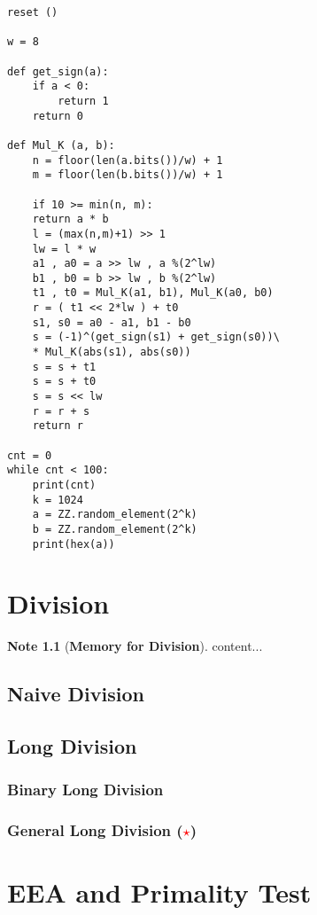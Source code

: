 \documentclass[12pt,openany]{book}
\theoremstyle{definition}
\newtheorem*{note}{Note}
\begin{document}
\newpage
\begin{lstlisting}[style=sage, caption={Karatsuba SAGE ver.},captionpos=t]
reset ()

w = 8

def get_sign(a):
	if a < 0:
		return 1
	return 0

def Mul_K (a, b):
	n = floor(len(a.bits())/w) + 1
	m = floor(len(b.bits())/w) + 1
	
	if 10 >= min(n, m):
	return a * b
	l = (max(n,m)+1) >> 1
	lw = l * w
	a1 , a0 = a >> lw , a %(2^lw)
	b1 , b0 = b >> lw , b %(2^lw)
	t1 , t0 = Mul_K(a1, b1), Mul_K(a0, b0)
	r = ( t1 << 2*lw ) + t0
	s1, s0 = a0 - a1, b1 - b0
	s = (-1)^(get_sign(s1) + get_sign(s0))\
	* Mul_K(abs(s1), abs(s0))
	s = s + t1
	s = s + t0
	s = s << lw
	r = r + s
	return r

cnt = 0
while cnt < 100:
	print(cnt)
	k = 1024
	a = ZZ.random_element(2^k)
	b = ZZ.random_element(2^k)
	print(hex(a))
\end{lstlisting}
	\newpage
	\chapter{Division}
	\begin{note}[\bf Memory for Division]
		content...
	\end{note}
	\section{Naive Division}
	\section{Long Division}
	\subsection{Binary Long Division}
	\subsection{General Long Division (\textcolor{red}{$\star$})}
	\chapter{EEA and Primality Test}
\end{document}
